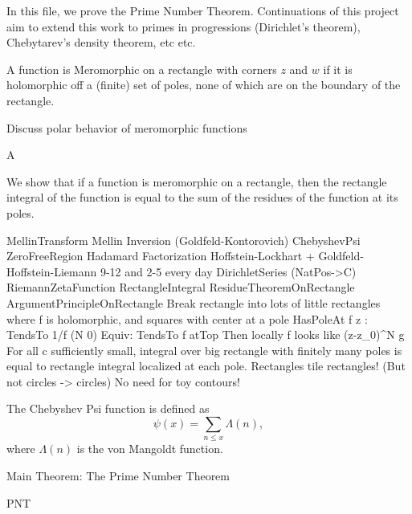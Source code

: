 

In this file, we prove the Prime Number Theorem. Continuations of this project aim to extend
this work to primes in progressions (Dirichlet's theorem), Chebytarev's density theorem, etc
etc.




A function is Meromorphic on a rectangle with corners $z$ and $w$ if it is holomorphic off a
(finite) set of poles, none of which are on the boundary of the rectangle.



Discuss polar behavior of meromorphic functions

A




We show that if a function is meromorphic on a rectangle, then the rectangle integral of the
function is equal to the sum of the residues of the function at its poles.



MellinTransform
Mellin Inversion (Goldfeld-Kontorovich)
ChebyshevPsi
ZeroFreeRegion
Hadamard Factorization
Hoffstein-Lockhart + Goldfeld-Hoffstein-Liemann
9-12 and 2-5 every day
DirichletSeries (NatPos->C)
RiemannZetaFunction
RectangleIntegral
ResidueTheoremOnRectangle
ArgumentPrincipleOnRectangle
Break rectangle into lots of little rectangles where f is holomorphic, and squares with center at a pole
HasPoleAt f z : TendsTo 1/f (N 0)
Equiv: TendsTo f atTop
Then locally f looks like (z-z_0)^N g
For all c sufficiently small, integral over big rectangle with finitely many poles is equal to rectangle integral localized at each pole.
Rectangles tile rectangles! (But not circles -> circles) No need for toy contours!




\begin{definition}
The Chebyshev Psi function is defined as
$$
\psi(x) = \sum_{n \leq x} \Lambda(n),
$$
where $\Lambda(n)$ is the von Mangoldt function.
\end{definition}




Main Theorem: The Prime Number Theorem
\begin{theorem}[PrimeNumberTheorem]
PNT
\end{theorem}


